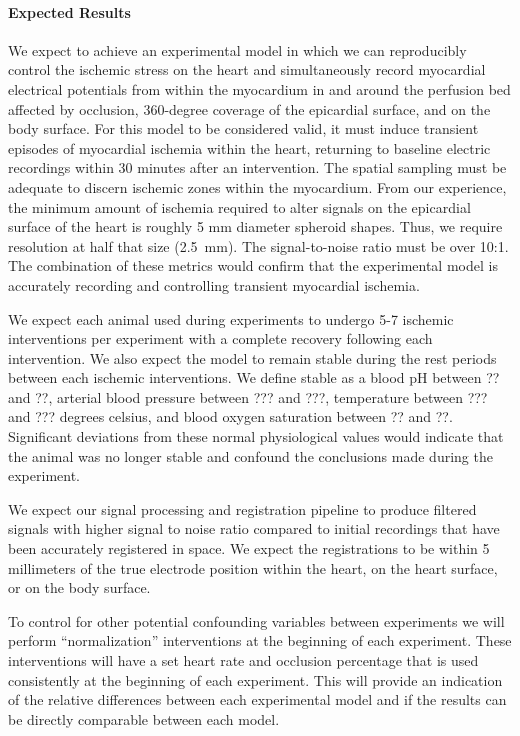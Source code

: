 \paragraph{Expected Results} We expect to achieve an experimental model in which we can reproducibly control the ischemic stress on the heart and simultaneously record myocardial electrical potentials from within the myocardium in and around the perfusion bed affected by occlusion, 360-degree coverage of the epicardial surface, and on the body surface.  For this model to be considered valid, it must induce transient episodes of myocardial ischemia within the heart, returning to baseline electric recordings within 30 minutes after an intervention. The spatial sampling must be adequate to discern ischemic zones within the myocardium. From our experience, the minimum amount of ischemia required to alter signals on the epicardial surface of the heart is roughly 5 mm diameter spheroid shapes. Thus, we require resolution at half that size (2.5~mm).  The signal-to-noise ratio must be over 10:1. The combination of these metrics would confirm that the experimental model is accurately recording and controlling transient myocardial ischemia.

We expect each animal used during experiments to undergo 5-7 ischemic interventions per experiment with a complete recovery following each intervention. We also expect the model to remain stable during the rest periods between each ischemic interventions. We define stable as a blood pH between ?? and ??, arterial blood pressure between ??? and ???, temperature between ??? and ??? degrees celsius, and blood oxygen saturation between ?? and ??. Significant deviations from these normal physiological values would indicate that the animal was no longer stable and confound the conclusions made during the experiment. 

We expect our signal processing and registration pipeline to produce filtered signals with higher signal to noise ratio compared to initial recordings that have been accurately registered in space. We expect the registrations to be within 5 millimeters of the true electrode position within the heart, on the heart surface, or on the body surface. 

To control for other potential confounding variables between experiments we will perform ``normalization'' interventions at the beginning of each experiment. These interventions will have a set heart rate and occlusion percentage that is used consistently at the beginning of each experiment. This will provide an indication of the relative differences between each experimental model and if the results can be directly comparable between each model. 


